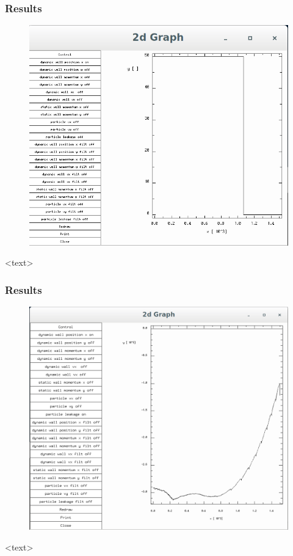 \documentclass{beamer}
\begin{document}
\begin{frame}
\frametitle{Results}
\begin{figure}
\includegraphics[scale=0.2]{A1p2}
\caption{}
\end{figure}
<text>
\end{frame}

\begin{frame}
\frametitle{Results}
\begin{figure}
\includegraphics[scale=0.2]{A1p5}
\caption{}
\end{figure}
<text>
\end{frame}
\end{document}
